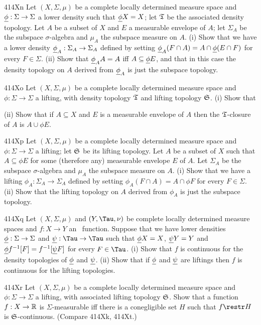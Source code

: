 {\spheader 414Xn Let $(X,\Sigma,\mu)$ be a complete locally determined
measure space and $\underline{\phi}:\Sigma\to\Sigma$ a lower density such that
$\underline{\phi} X=X$;  let $\frak T$ be the associated density topology.   Let
$A$ be a subset of $X$ and $E$ a measurable envelope of $A$;  let
$\Sigma_A$ be
the subspace $\sigma$-algebra and $\mu_A$ the subspace measure on $A$.
(i) Show that we have a lower density
$\hbox{$\underline{\phi}$}_A:\Sigma_A\to\Sigma_A$ defined by setting
$\hbox{$\underline{\phi}$}_A(F\cap A)=A\cap\underline{\phi}(E\cap F)$ for every
$F\in\Sigma$.   (ii) Show that $\hbox{$\underline{\phi}$}_AA=A$ iff
$A\subseteq\underline{\phi} E$, and that in this case the density topology on $A$
derived from $\hbox{$\underline{\phi}$}_A$ is just the subspace topology.

\spheader 414Xo Let $(X,\Sigma,\mu)$ be a complete locally determined
measure space and $\phi:\Sigma\to\Sigma$ a lifting, with density
topology $\frak T$ and lifting topology $\frak S$.   (i) Show that


\noindent (ii) Show that if $A\subseteq X$ and $E$ is a measurable
envelope of $A$ then the $\frak T$-closure of $A$ is $A\cup\phi E$.

\spheader 414Xp Let $(X,\Sigma,\mu)$ be a complete locally determined
measure space and $\phi:\Sigma\to\Sigma$ a lifting;  let $\frak S$ be
its lifting topology.   Let $A$ be a subset of $X$ such that
$A\subseteq\phi E$ for some (therefore any) measurable
envelope $E$ of $A$.  Let $\Sigma_A$ be the
subspace $\sigma$-algebra and $\mu_A$ the subspace measure on $A$.   (i)
Show that we have a lifting $\phi_A:\Sigma_A\to\Sigma_A$ defined by
setting $\phi_A(F\cap A)=A\cap\phi F$ for every $F\in\Sigma$.   (ii)
Show that the lifting topology on $A$ derived from $\phi_A$ is just the
subspace topology.

\spheader 414Xq Let $(X,\Sigma,\mu)$ and $(Y,\Tau,\nu)$ be
complete locally determined
measure spaces and $f:X\to Y$ an \imp\ function.
Suppose that we have lower densities $\underline{\phi}:\Sigma\to\Sigma$ and
$\undpsi:\Tau\to\Tau$ such that $\underline{\phi} X=X$, $\underline{\psi} Y=Y$ and
$\underline{\phi} f^{-1}[F]=f^{-1}[\underline{\psi} F]$ for every $F\in\Tau$.   (i) Show that
$f$ is continuous for the density topologies of $\underline{\phi}$ and $\underline{\psi}$.
(ii) Show that if $\underline{\phi}$ and $\underline{\psi}$ are liftings then $f$ is
continuous for the lifting topologies.

\spheader 414Xr Let $(X,\Sigma,\mu)$ be a complete locally determined
measure space and $\phi:\Sigma\to\Sigma$ a lifting, with associated
lifting topology $\frak S$.   Show that a function $f:X\to\Bbb R$ is
$\Sigma$-measurable iff there is a conegligible set $H$ such that
$f\restr H$ is $\frak S$-continuous.   (Compare 414Xk, 414Xt.)

}
